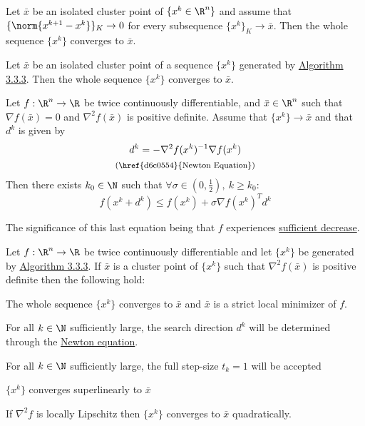 \label{a95dfe1}

Let $\bar x$ be an isolated cluster point of $\{x^k\in\R^n\}$ and assume that
$\{\norm{x^{k+1}-x^k}\}_K\to0$ for every subsequence $\{x^k\}_K\to\bar x$. Then
the whole sequence $\{x^k\}$ converges to $\bar x$.

\label{aabc89a}

Let $\bar x$ be an isolated cluster point of a sequence $\{x^k\}$ generated by
\href{a7a5665}{Algorithm 3.3.3}. Then the whole sequence $\{x^k\}$ converges to
$\bar x$.

\label{d6d6148}

Let $f:\R^n\to\R$ be twice continuously differentiable, and $\bar x\in\R^n$
such that $\nabla f(\bar x)=0$ and $\nabla^2f(\bar x)$ is positive definite.
Assume that $\{x^k\}\to\bar x$ and that $d^k$ is given by
\begin{gather*}
  d^k = -\nabla^2f(x^k)^{-1}\nabla f(x^k) \\
  \text{\footnotesize{(\href{d6c0554}{Newton Equation})}}
\end{gather*}
Then there exists $k_0\in\N$ such that $\forall\sigma\in(0,\frac12),\ k\geq k_0$:
$$
  f(x^k+d^k)\leq f(x^k)+\sigma\nabla f(x^k)^Td^k
$$

The significance of this last equation being that $f$ experiences
\href{fefb024}{sufficient decrease}.

\label{e58830c}

Let $f:\R^n\to\R$ be twice continuously differentiable and let $\{x^k\}$ be
generated by \href{a7a5665}{Algorithm 3.3.3}. If $\bar x$ is a cluster point of
$\{x^k\}$ such that $\nabla^2f(\bar x)$ is positive definite then the following
hold:
\begin{enumerata}
  \item The whole sequence $\{x^k\}$ converges to $\bar x$ and $\bar x$ is a strict
  local minimizer of $f$.
  \item For all $k\in\N$ sufficiently large, the search direction $d^k$ will be
  determined through the \href{d6c0554}{Newton equation}.
  \item For all $k\in\N$ sufficiently large, the full step-size $t_k=1$ will be
  accepted
  \item $\{x^k\}$ converges superlinearly to $\bar x$
  \item If $\nabla^2f$ is locally Lipschitz then $\{x^k\}$ converges to $\bar x$
  quadratically.
\end{enumerata}

